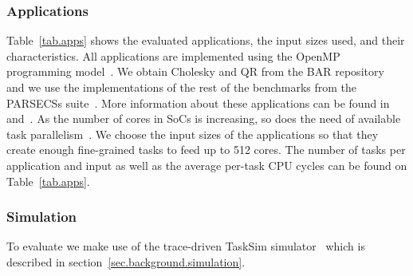 \subsubsection{Applications}
Table~\ref{tab.apps} shows the evaluated applications, the input sizes used, and their characteristics. 
All applications are implemented using the OpenMP programming model~\cite{OpenMP4.0:Manual2015}. 
We obtain Cholesky and QR from the BAR repository~\cite{BAR} and we use the implementations of the rest of the benchmarks from the PARSECSs suite~\cite{Chasapis:TACO2016}.
More information about these applications can be found in~\cite{Chasapis:TACO2016} and~\cite{Chronaki:ICS2015}.
As the number of cores in SoCs is increasing, so does the need of available task parallelism~\cite{Sanchez:2010}. 
We choose the input sizes of the applications so that they create enough fine-grained tasks to feed up to 512 cores.
The number of tasks per application and input as well as the average per-task CPU cycles can be found on Table~\ref{tab.apps}.





\subsubsection{Simulation}
\label{sec:experimental:simulation}
To evaluate {\proposal} we make use of the trace-driven TaskSim simulator~\cite{AbstrLevels_TACO12,MUSA} which is described in section~\ref{sec.background.simulation}. 

